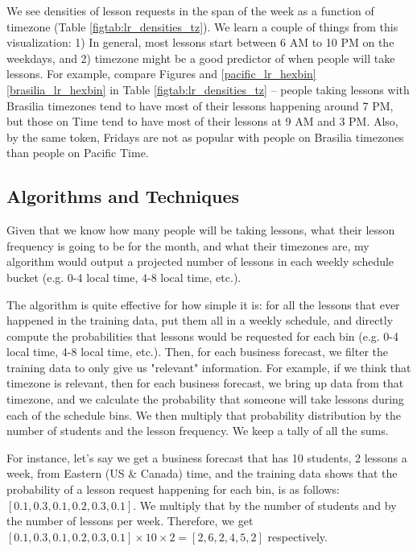 \documentclass[oneside]{article}
\begin{document}
We see densities of lesson requests in the span of the week as a function of
timezone (Table \ref{figtab:lr_densities_tz}). We learn a couple of things from
this visualization: 1) In general, most lessons start between 6 AM to 10 PM on
the weekdays, and 2) timezone might be a good predictor of when people will
take lessons. For example, compare Figures and \ref{pacific_lr_hexbin}
\ref{brasilia_lr_hexbin} in Table \ref{figtab:lr_densities_tz} -- people taking
lessons with Brasilia timezones tend to have most of their lessons happening
around 7 PM, but those on Time tend to have most of their lessons at 9 AM and 3
PM. Also, by the same token, Fridays are not as popular with people on Brasilia
timezones than people on Pacific Time.

\subsection{Algorithms and Techniques}

Given that we know how many people will be taking lessons, what their lesson
frequency is going to be for the month, and what their timezones are, my
algorithm would output a projected number of lessons in each weekly schedule
bucket (e.g. 0-4 local time, 4-8 local time, etc.).

The algorithm is quite effective for how simple it is: for all the lessons that
ever happened in the training data, put them all in a weekly schedule, and
directly compute the probabilities that lessons would be requested for each bin
(e.g. 0-4 local time, 4-8 local time, etc.). Then, for each business forecast,
we filter the training data to only give us "relevant" information. For
example, if we think that timezone is relevant, then for each business
forecast, we bring up data from that timezone, and we calculate the probability
that someone will take lessons during each of the schedule bins.  We then
multiply that probability distribution by the number of students and the lesson
frequency. We keep a tally of all the sums.

For instance, let's say we get a business forecast that has 10 students, 2
lessons a week, from Eastern (US \& Canada) time, and the training data shows
that the probability of a lesson request happening for each bin, is as follows:
$[0.1, 0.3, 0.1, 0.2, 0.3, 0.1]$. We multiply that by the number of students
and by the number of lessons per week.  Therefore, we get $[0.1, 0.3, 0.1, 0.2,
0.3, 0.1] \times 10 \times 2 = [2,6,2,4,5,2]$ respectively.
\end{document}
